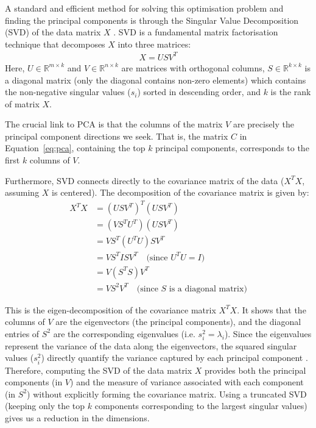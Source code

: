 \documentclass[10pt,oneside]{report}
\begin{document}
A standard and efficient method for solving this optimisation problem and finding the principal components is through the Singular Value Decomposition (SVD) of the data matrix $X$ \cite{steinberger2005text, udell2016generalized}. SVD is a fundamental matrix factorisation technique that decomposes $X$ into three matrices:
\begin{align}
    X = USV^T \label{eq:svd} %
\end{align}
Here, $U \in \mathbb{R}^{m \times k}$ and $V \in \mathbb{R}^{n \times k}$ are matrices with orthogonal columns, $S \in \mathbb{R}^{k \times k}$ is a diagonal matrix (only the diagonal contains non-zero elements) which contains the non-negative singular values ($s_i$) sorted in descending order, and $k$ is the rank of matrix $X$.

The crucial link to PCA is that the columns of the matrix $V$ are precisely the principal component directions we seek. That is, the matrix $C$ in Equation~\ref{eq:pca}, containing the top $k$ principal components, corresponds to the first $k$ columns of $V$.

Furthermore, SVD connects directly to the covariance matrix of the data ($X^TX$, assuming $X$ is centered). The decomposition of the covariance matrix is given by:
\begin{align}
    X^TX &= (USV^T)^T (USV^T) \\ %
         &= (VS^T U^T) (USV^T) \\ %
         &= V S^T (U^T U) S V^T \\ %
         &= V S^T I S V^T \quad \text{(since } U^T U = I \text{)} \\
         &= V (S^T S) V^T \\
         &= V S^2 V^T\quad \text{(since } S \text{ is a diagonal matrix)}
         \label{eq:svd_covariance} %
\end{align}

This is the eigen-decomposition of the covariance matrix $X^TX$. It shows that the columns of $V$ are the eigenvectors (the principal components), and the diagonal entries of $S^2$  are the corresponding eigenvalues (i.e. $s_i^2 = \lambda_i$). Since the eigenvalues represent the variance of the data along the eigenvectors, the squared singular values ($s_i^2$) directly quantify the variance captured by each principal component \cite{udell2016generalized}. Therefore, computing the SVD of the data matrix $X$ provides both the principal components (in $V$) and the measure of variance associated with each component (in $S^2$) without explicitly forming the covariance matrix. Using a truncated SVD (keeping only the top $k$ components corresponding to the largest singular values) gives us a reduction in the dimensions.
\end{document}
